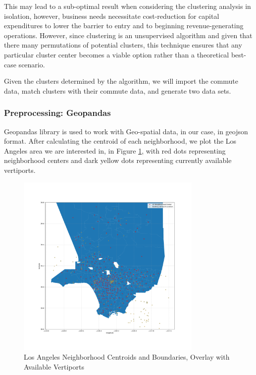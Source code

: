\documentclass{article}
\begin{document}
This may lead to a sub-optimal result when considering the clustering analysis in isolation, however, business needs necessitate cost-reduction for capital expenditures to lower the barrier to entry and to beginning revenue-generating operations. However, since clustering is an unsupervised algorithm and given that there many permutations of potential clusters, this technique ensures that any particular cluster center becomes a viable option rather than a theoretical best-case scenario.

Given the clusters determined by the algorithm, we will import the commute data, match clusters with their commute data, and generate two data sets.

\subsubsection{Preprocessing: Geopandas}
Geopandas library is used to work with Geo-spatial data, in our case, in geojson format. After calculating the centroid of each neighborhood, we plot the Los Angeles area we are interested in, in Figure \ref{fig:proj01}, with red dots representing neighborhood centers and dark yellow dots representing currently available vertiports.

\begin{figure}[ht]
\centering
\includegraphics[width=0.8\textwidth]{proj01.png}
\vspace*{-10mm}
\caption{Los Angeles Neighborhood Centroids and Boundaries, Overlay with Available Vertiports }
\label{fig:proj01}
\end{figure}
\end{document}
